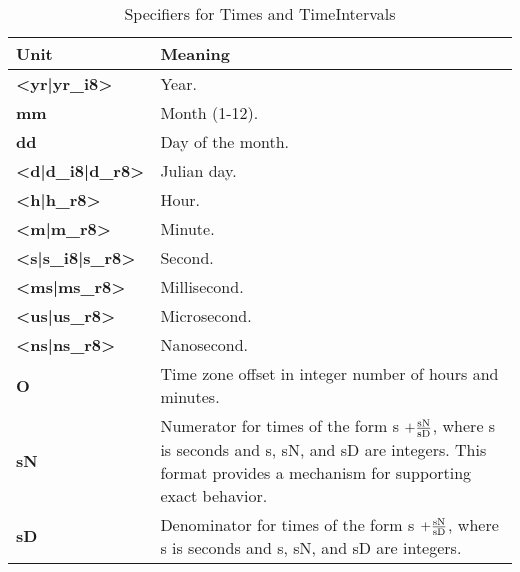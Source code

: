 \newpage
\begin{center}
\begin{table}
\caption{\label{table:timeOpts}Specifiers for Times and TimeIntervals}
\begin{tabular}{|p{1in}|p{3.5in}|}
\hline
Unit & Meaning \\
\hline\hline
{\bf <yr|yr\_i8>} & Year. \\
\hline
{\bf mm} & Month (1-12). \\
\hline
{\bf dd} & Day of the month. \\
\hline
{\bf <d|d\_i8|d\_r8>} & Julian day. \\
\hline
{\bf <h|h\_r8>} & Hour. \\
\hline
{\bf <m|m\_r8>} & Minute. \\
\hline
{\bf <s|s\_i8|s\_r8>} & Second. \\
\hline
{\bf <ms|ms\_r8>} & Millisecond. \\
\hline
{\bf <us|us\_r8>} & Microsecond. \\
\hline
{\bf <ns|ns\_r8>} & Nanosecond. \\
\hline
{\bf O} & Time zone offset in integer number of hours and minutes. \\
\hline
{\bf sN} & Numerator for times of the form s {\bf $ + 
\frac{{\rm sN}}{{\rm sD}}$}, where s is seconds and s, sN, and
sD are integers.  This format provides a mechanism for supporting
exact behavior. \\
\hline
{\bf sD} & Denominator for times of the form s {\bf $ + 
\frac{{\rm sN}}{{\rm sD}}$}, where s is seconds and s, sN, and
sD are integers. \\
\hline
\end{tabular}
\end{table}
\end{center}
